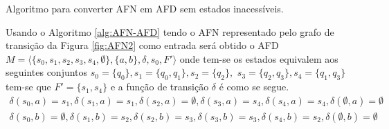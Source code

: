\begin{algorithm}[h]
	\caption{Algoritmo para converter AFN em AFD sem estados inacessíveis.}
	\label{alg:AFN-AFD}
\end{algorithm}

\begin{example}\label{exe:ConvertendoAFN-AFD}
	Usando o Algoritmo \ref{alg:AFN-AFD}  tendo o AFN representado pelo grafo de transição da Figura \ref{fig:AFN2} como entrada será obtido o AFD $M = \langle \{s_0, s_1, s_2, s_3, s_4, \emptyset\}, \{a,b\}, \delta, s_0, F'\rangle$ onde tem-se os estados equivalem aos seguintes conjuntos $s_0 = \{q_0\}, s_1 = \{q_0, q_1\}, s_2 = \{q_2\},$ $s_3 = \{q_2, q_3\}, s_4 = \{q_1, q_3\}$ tem-se que $F' = \{s_1, s_4\}$ e a função de transição $\delta$ é como se segue. 
	\begin{eqnarray*}
		\delta(s_0, a) = s_1, \delta(s_1, a) = s_1, \delta(s_2, a) = \emptyset, \delta(s_3, a) = s_4, \delta(s_4, a) = s_4,  \delta(\emptyset, a) = \emptyset \\
		\delta(s_0, b) = \emptyset, \delta(s_1, b) = s_2, \delta(s_2, b) = s_3, \delta(s_3, b) = s_3, \delta(s_4, b) = s_2, \delta(\emptyset, b) = \emptyset
	\end{eqnarray*}
\end{example}

